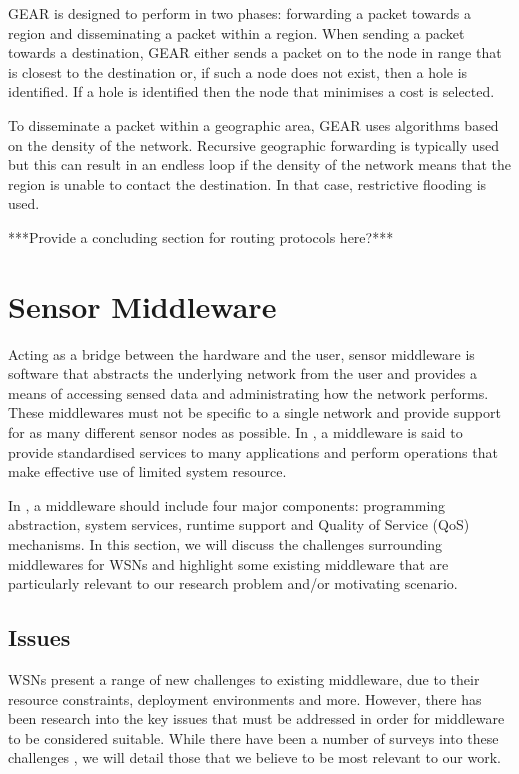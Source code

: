 GEAR is designed to perform in two phases: forwarding a packet towards a region and disseminating a packet within a region. When sending a packet towards a destination, GEAR either sends a packet on to the node in range that is closest to the destination or, if such a node does not exist, then a hole is identified. If a hole is identified then the node that minimises a cost is selected.

To disseminate a packet within a geographic area, GEAR uses algorithms based on the density of the network. Recursive geographic forwarding is typically used but this can result in an endless loop if the density of the network means that the region is unable to contact the destination. In that case, restrictive flooding is used.

***Provide a concluding section for routing protocols here?***

\section{Sensor Middleware} \label{bg:sm}
	Acting as a bridge between the hardware and the user, sensor middleware is software that abstracts the underlying network from the user and provides a means of accessing sensed data and administrating how the network performs. These middlewares must not be specific to a single network and provide support for as many different sensor nodes as possible. In \cite{Yu2004}, a middleware is said to provide standardised services to many applications and perform operations that make effective use of limited system resource.

	In \cite{Wang2008c}, a middleware should include four major components: programming abstraction, system services, runtime support and Quality of Service (QoS) mechanisms. In this section, we will discuss the challenges surrounding middlewares for WSNs and highlight some existing middleware that are particularly relevant to our research problem and/or motivating scenario.

\subsection{Issues}\label{bg:sm:issues}
	WSNs present a range of new challenges to existing middleware, due to their resource constraints, deployment environments and more. However, there has been research into the key issues that must be addressed in order for middleware to be considered suitable.
	While there have been a number of surveys into these challenges \cite{Hadim2006, Rahman, Yu2004}, we will detail those that we believe to be most relevant to our work.
